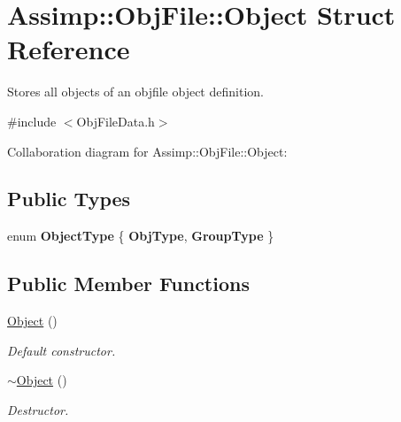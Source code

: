 \hypertarget{struct_assimp_1_1_obj_file_1_1_object}{\section{Assimp\+:\+:Obj\+File\+:\+:Object Struct Reference}
\label{struct_assimp_1_1_obj_file_1_1_object}
}


Stores all objects of an objfile object definition.  




{\ttfamily \#include $<$Obj\+File\+Data.\+h$>$}



Collaboration diagram for Assimp\+:\+:Obj\+File\+:\+:Object\+:
\subsection*{Public Types}
\begin{DoxyCompactItemize}
\item 
\hypertarget{struct_assimp_1_1_obj_file_1_1_object_a411419c4a57b33b2e36114f1b844f906}{enum {\bfseries Object\+Type} \{ {\bfseries Obj\+Type}, 
{\bfseries Group\+Type}
 \}}\label{struct_assimp_1_1_obj_file_1_1_object_a411419c4a57b33b2e36114f1b844f906}

\end{DoxyCompactItemize}
\subsection*{Public Member Functions}
\begin{DoxyCompactItemize}
\item 
\hypertarget{struct_assimp_1_1_obj_file_1_1_object_ada8fce3cf96f66e65e5464ac33088f32}{\hyperlink{struct_assimp_1_1_obj_file_1_1_object_ada8fce3cf96f66e65e5464ac33088f32}{Object} ()}\label{struct_assimp_1_1_obj_file_1_1_object_ada8fce3cf96f66e65e5464ac33088f32}

\begin{DoxyCompactList}\small\item\em Default constructor. \end{DoxyCompactList}\item 
\hypertarget{struct_assimp_1_1_obj_file_1_1_object_ab5834da552b6a8d037161ec887e7fdbe}{\hyperlink{struct_assimp_1_1_obj_file_1_1_object_ab5834da552b6a8d037161ec887e7fdbe}{$\sim$\+Object} ()}\label{struct_assimp_1_1_obj_file_1_1_object_ab5834da552b6a8d037161ec887e7fdbe}

\begin{DoxyCompactList}\small\item\em Destructor. \end{DoxyCompactList}\end{DoxyCompactItemize}
